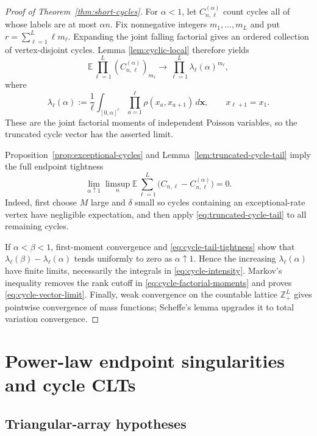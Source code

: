 \documentclass[11pt]{article}
\theoremstyle{remark}
\theoremstyle{plain}
\newcommand{\E}{\mathbb E}
\begin{document}
\begin{proof}[Proof of Theorem~\ref{thm:short-cycles}]
For $\alpha<1$, let $C_{n,\ell}^{(\alpha)}$ count cycles all of whose labels
are at most $\alpha n$.  Fix nonnegative integers $m_1,\ldots,m_L$ and put
$r=\sum_{\ell=1}^L\ell m_\ell$.  Expanding the joint falling factorial gives
an ordered collection of vertex-disjoint cycles.  Lemma
\ref{lem:cyclic-local} therefore yields
\begin{equation}\label{eq:cycle-factorial-moments}
 \E\prod_{\ell=1}^L(C_{n,\ell}^{(\alpha)})_{m_\ell}
 \longrightarrow
 \prod_{\ell=1}^L\lambda_\ell(\alpha)^{m_\ell},
\end{equation}
where
\[
 \lambda_\ell(\alpha):=\frac1\ell
 \int_{[0,\alpha]^\ell}
 \prod_{a=1}^\ell\rho(x_a,x_{a+1})\,d\boldsymbol x,
 \qquad x_{\ell+1}=x_1.
\]
These are the joint factorial moments of independent Poisson variables, so
the truncated cycle vector has the asserted limit.

Proposition~\ref{prop:exceptional-cycles} and
Lemma~\ref{lem:truncated-cycle-tail} imply the full endpoint tightness
\begin{equation}\label{eq:cycle-tail-tightness}
 \lim_{\alpha\uparrow1}\limsup_n
 \E\sum_{\ell=1}^L
 \bigl(C_{n,\ell}-C_{n,\ell}^{(\alpha)}\bigr)=0.
\end{equation}
Indeed, first choose $M$ large and $\delta$ small so cycles containing an
exceptional-rate vertex have negligible expectation, and then apply
\eqref{eq:truncated-cycle-tail} to all remaining cycles.

If $\alpha<\beta<1$, first-moment convergence and
\eqref{eq:cycle-tail-tightness} show that
$\lambda_\ell(\beta)-\lambda_\ell(\alpha)$ tends uniformly to zero as
$\alpha\uparrow1$.  Hence the increasing $\lambda_\ell(\alpha)$ have finite
limits, necessarily the integrals in \eqref{eq:cycle-intensity}.  Markov's
inequality removes the rank cutoff in \eqref{eq:cycle-factorial-moments} and
proves \eqref{eq:cycle-vector-limit}.  Finally, weak convergence on the
countable lattice $\mathbb Z_+^L$ gives pointwise convergence of mass
functions; Scheffe's lemma upgrades it to total variation convergence.
\end{proof}

\section{Power-law endpoint singularities and cycle CLTs}
\label{sec:power-law}

\subsection{Triangular-array hypotheses}
\end{document}

